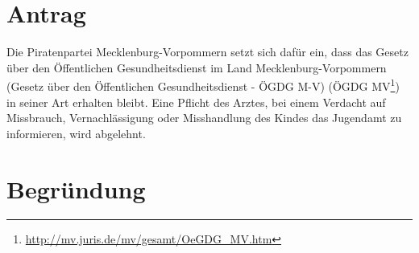 \section{Antrag}

Die Piratenpartei Mecklenburg-Vorpommern setzt sich dafür ein, dass das Gesetz über den Öffentlichen Gesundheitsdienst im Land Mecklenburg-Vorpommern (Gesetz über den Öffentlichen Gesundheitsdienst - ÖGDG M-V) (ÖGDG MV\footnote{\url{http://mv.juris.de/mv/gesamt/OeGDG\_MV.htm}}) in seiner Art erhalten bleibt. Eine Pflicht des Arztes, bei einem Verdacht auf Missbrauch, Vernachlässigung oder Misshandlung des Kindes das Jugendamt zu informieren, wird abgelehnt.

\section{Begründung}

